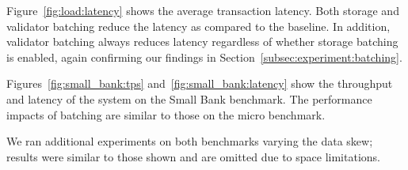 Figure~\ref{fig:load:latency} shows the average transaction latency. Both storage and validator batching reduce the latency as compared to the baseline. In addition, validator batching always reduces latency regardless of whether storage batching is enabled, again confirming our findings in Section~\ref{subsec:experiment:batching}.

Figures~\ref{fig:small_bank:tps} and~\ref{fig:small_bank:latency} show the throughput and latency of the system on the Small Bank benchmark. 
The performance impacts of batching are similar to those on the micro benchmark.

We ran additional experiments on both benchmarks varying the data skew; results were similar to those shown and are omitted due to space limitations.

